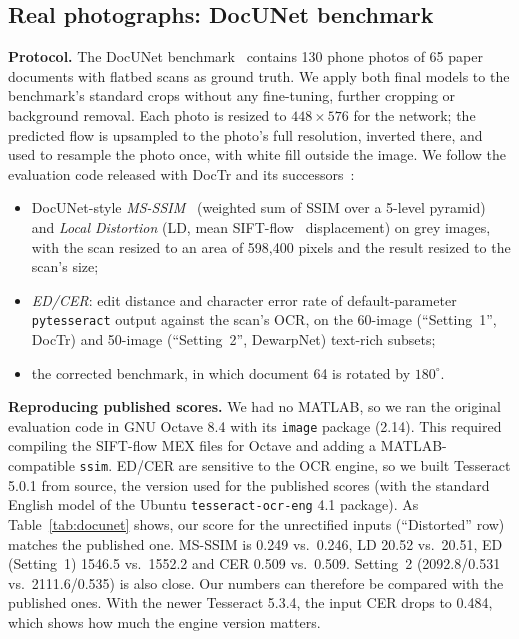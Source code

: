 \documentclass[conference]{IEEEtran}
\begin{document}
\subsection{Real photographs: DocUNet benchmark}
\label{sec:docunet}
\textbf{Protocol.} The DocUNet benchmark~\cite{ma2018docunet} contains 130 phone photos of 65 paper documents with flatbed scans as ground truth. We apply both final models to the benchmark's standard crops without any fine-tuning, further cropping or background removal. Each photo is resized to $448\times576$ for the network; the predicted flow is upsampled to the photo's full resolution, inverted there, and used to resample the photo once, with white fill outside the image. We follow the evaluation code released with DocTr and its successors~\cite{feng2021doctr,feng2022docgeonet,feng2025docscanner,feng2024doctrpp}:
\begin{itemize}
\item DocUNet-style \emph{MS-SSIM}~\cite{ma2018docunet,wang2003msssim} (weighted sum of SSIM over a 5-level pyramid) and \emph{Local Distortion} (LD, mean SIFT-flow~\cite{liu2011siftflow} displacement) on grey images, with the scan resized to an area of 598{,}400 pixels and the result resized to the scan's size;
\item \emph{ED/CER}: edit distance and character error rate of default-parameter \texttt{pytesseract} output against the scan's OCR, on the 60-image (``Setting~1'', DocTr) and 50-image (``Setting~2'', DewarpNet) text-rich subsets;
\item the corrected benchmark, in which document 64 is rotated by $180^\circ$.
\end{itemize}

\textbf{Reproducing published scores.} We had no MATLAB, so we ran the original evaluation code in GNU Octave 8.4 with its \texttt{image} package (2.14). This required compiling the SIFT-flow MEX files for Octave and adding a MATLAB-compatible \texttt{ssim}. ED/CER are sensitive to the OCR engine, so we built Tesseract 5.0.1 from source, the version used for the published scores (with the standard English model of the Ubuntu \texttt{tesseract-ocr-eng} 4.1 package). As Table~\ref{tab:docunet} shows, our score for the unrectified inputs (``Distorted'' row) matches the published one. MS-SSIM is 0.249 vs.\ 0.246, LD 20.52 vs.\ 20.51, ED (Setting~1) 1546.5 vs.\ 1552.2 and CER 0.509 vs.\ 0.509. Setting~2 (2092.8/0.531 vs.\ 2111.6/0.535) is also close. Our numbers can therefore be compared with the published ones. With the newer Tesseract 5.3.4, the input CER drops to 0.484, which shows how much the engine version matters.
\end{document}
